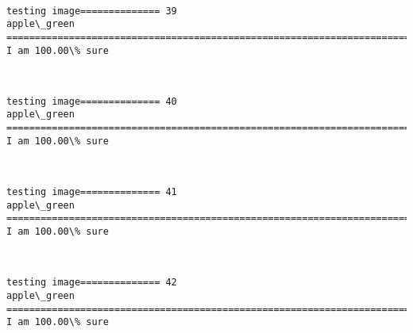 \documentclass[11pt]{article}
\begin{document}
    \begin{center}
    \end{center}
    { \hspace*{\fill} \\}
    
    \begin{Verbatim}[commandchars=\\\{\}]
testing image============== 39
apple\_green
============================================================================
I am 100.00\% sure

    \end{Verbatim}

    \begin{center}
    \end{center}
    { \hspace*{\fill} \\}
    
    \begin{Verbatim}[commandchars=\\\{\}]
testing image============== 40
apple\_green
============================================================================
I am 100.00\% sure

    \end{Verbatim}

    \begin{center}
    \end{center}
    { \hspace*{\fill} \\}
    
    \begin{Verbatim}[commandchars=\\\{\}]
testing image============== 41
apple\_green
============================================================================
I am 100.00\% sure

    \end{Verbatim}

    \begin{center}
    \end{center}
    { \hspace*{\fill} \\}
    
    \begin{Verbatim}[commandchars=\\\{\}]
testing image============== 42
apple\_green
============================================================================
I am 100.00\% sure

    \end{Verbatim}
\end{document}
